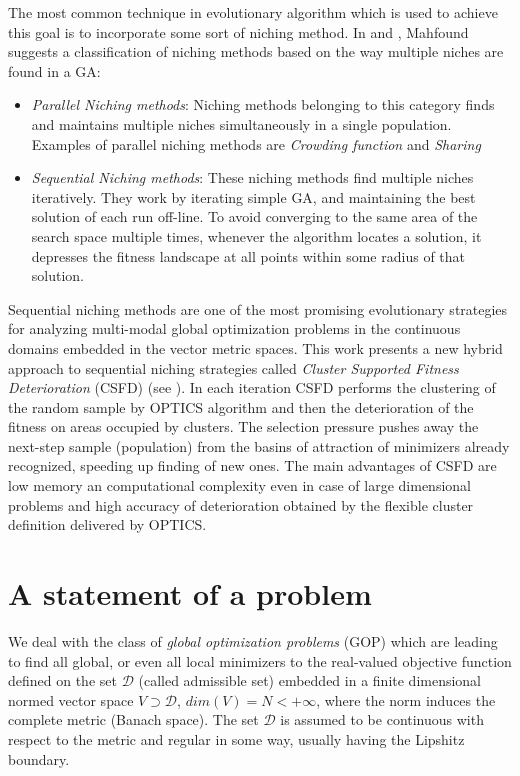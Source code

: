 The most common technique in evolutionary algorithm which is
used to achieve this goal is to incorporate some sort of niching method.
In \cite{Mahfound95niching} and \cite{Mahfoud95acomparison}, Mahfound 
suggests a classification of niching methods based on the way multiple niches
are found in a GA:
\begin{itemize}
  \item \textit{Parallel Niching methods}: Niching methods belonging to this
  category finds and maintains multiple niches simultaneously in a single population. 
  Examples of parallel niching methods are \textit{Crowding function} and
  \textit{Sharing}
  \item \textit{Sequential Niching methods}: These niching methods find multiple
  niches iteratively. They work by iterating simple GA, and maintaining the
  best solution of each run off-line. To avoid converging to the same area of the
  search space multiple times, whenever the algorithm locates a solution, it
  depresses the fitness landscape at all points within some radius of that
  solution.
\end{itemize}
Sequential niching methods are one of the most promising evolutionary strategies
for analyzing multi-modal global optimization problems in the continuous
domains embedded in the vector metric spaces. This work presents a new hybrid
approach to sequential niching strategies called \textit{Cluster Supported Fitness
Deterioration} (CSFD) (see \cite{SchaeferWolny2011}).
In each iteration CSFD performs the clustering of the random sample 
by OPTICS algorithm and then the deterioration of the fitness
on areas occupied by clusters. The selection pressure pushes away
the next-step sample (population) from the basins of attraction
of minimizers already recognized, speeding up finding of new ones.
The main advantages of CSFD are low memory an computational complexity
even in case of large dimensional problems and high accuracy
of deterioration obtained by the flexible cluster definition 
delivered by OPTICS.

\section{A statement of a problem}
\label{sec:statementOfProblem}

We deal with the class of \textit{global optimization problems} (GOP)
which are leading to find all global, or even all local minimizers 
to the real-valued objective function defined on the set $\mathcal{D}$ 
(called admissible set) embedded
in a finite dimensional normed vector space $V \supset \mathcal{D}$, 
$dim(V) = N < +\infty$, where the norm
induces the complete metric (Banach space). The set $\mathcal{D}$
is assumed to be continuous with respect to the metric and regular
in some way, usually having the Lipshitz boundary.

